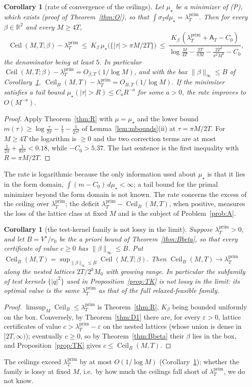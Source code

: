 \documentclass[11pt]{amsart}
\newtheorem{corollary}[theorem]{Corollary}
\theoremstyle{definition}
\theoremstyle{remark}
\newcommand{\R}{\mathbb R}
\newcommand{\lamP}{\lambda^{\mathrm{prim}}_T}
\newcommand{\sT}{\sigma_T}
\newcommand{\Aconst}{\mathsf A_T}
\begin{document}
\begin{corollary}[rate of convergence of the ceilings]\label{cor:Rrate}
Let $\mu_\star$ be a minimizer of \textup{(P)}, which exists (proof of Theorem~\ref{thm:O}), so that
$\int\sT d\mu_\star=\lamP$. Then for every $\beta\in\R^2$ and every $M\ge4T$,
\[
\operatorname{Ceil}(M,T;\beta)-\lamP\ \le\ K_\beta\,\mu_\star\big(\{|\tau|>\pi M/2T\}\big)
\ \le\ \frac{K_\beta\,(\lamP+\Aconst-C_0)}{\log\frac{M}{4T}-\frac{2T}{\pi M}-\frac{2T^2}{\pi^2M^2}-C_0},
\]
the denominator being at least $5$. In particular $\operatorname{Ceil}(M,T;\beta)-\lamP=O_{\beta,T}(1/\log M)$,
and with the box $\|\beta\|_\infty\le B$ of Corollary~\ref{cor:R3},
$\operatorname{Ceil}_B(M,T)-\lamP=O_{B,T}(1/\log M)$. If the minimizer satisfies a tail bound
$\mu_\star(|\tau|>R)\le C_aR^{-a}$ for some $a>0$, the rate improves to $O(M^{-a})$.
\end{corollary}
\begin{proof}
Apply Theorem~\ref{thm:R} with $\mu=\mu_\star$ and the lower bound $m(\tau)\ge\log\frac\tau{2\pi}-\frac1\tau-\frac1{2\tau^2}$
of Lemma~\ref{lem:mbounds}(ii) at $\tau=\pi M/2T$. For $M\ge4T$ the logarithm is $\ge0$ and the two
correction terms are at most $\frac1{2\pi}+\frac1{8\pi^2}<0.18$, while $-C_0>5.37$. The last sentence is the
first inequality with $R=\pi M/2T$.
\end{proof}
The rate is logarithmic because the only information used about $\mu_\star$ is that it lies in the form domain,
$\int(m-C_0)\,d\mu_\star<\infty$; a tail bound for the primal minimizer beyond the form domain is not known. The
rate concerns the excess of the ceiling over $\lamP$; the deficit $\lamP-\operatorname{Ceil}_B(M,T)$, when
positive, measures the loss of the lattice class at fixed $M$ and is the subject of Problem~\ref{prob:A}.

\begin{corollary}[the test-kernel family is not lossy in the limit]\label{cor:R3}
Suppose $\lamP>0$, and let $B=V^\star/r_0$ be the a priori bound of Theorem~\ref{thm:Bbeta}, so that
every certificate of value $c\ge0$ has $\|\beta\|_\infty\le B$. Put
$\operatorname{Ceil}_B(M,T)=\sup_{\|\beta\|_\infty\le B}\operatorname{Ceil}(M,T;\beta)$. Then
$\operatorname{Ceil}_B(M,T)\to\lamP$ along the nested lattices $2T/2^kM_0$ with growing range. In
particular the subfamily of test kernels $\{|q|^2\}$ used in Proposition~\ref{prop:TK} is not lossy in
the limit: its optimal value is the same $\lamP$ as that of the full relaxed-feasible family.
\end{corollary}
\begin{proof}
$\limsup_M\operatorname{Ceil}_B\le\lamP$ is Theorem~\ref{thm:R}, $K_\beta$ being bounded uniformly on
the box. Conversely, by Theorem~\ref{thm:D1} there are, for every $\varepsilon>0$, lattice
certificates of value $c>\lamP-\varepsilon$ on the nested lattices (whose union is dense in
$[2T,\infty)$); eventually $c\ge0$, so by Theorem~\ref{thm:Bbeta} their $\beta$ lies in the box, and
Proposition~\ref{prop:TK} gives $c\le\operatorname{Ceil}_B(M,T)$.
\end{proof}
The ceilings exceed $\lamP$ by at most $O(1/\log M)$ (Corollary~\ref{cor:Rrate}); whether the family is lossy at
fixed $M$, i.e.\ by how much the ceilings fall short of $\lamP$, we do not know.
\end{document}
